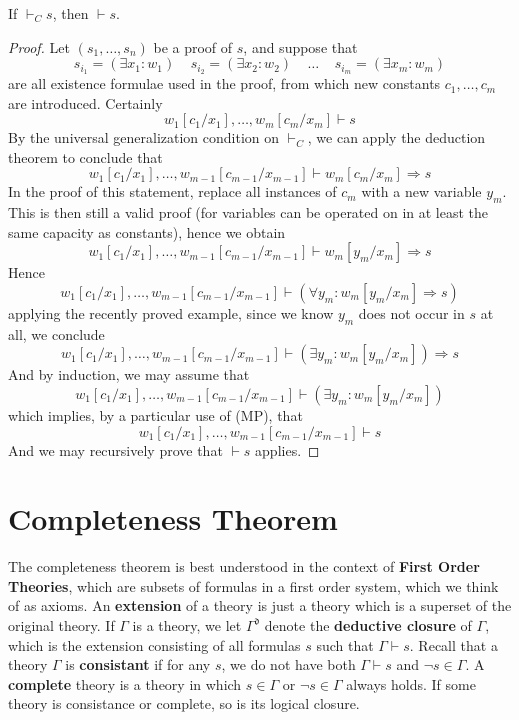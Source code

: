 \begin{theorem}
    If $\vdash_C s$, then $\vdash s$.
\end{theorem}
\begin{proof}
    Let $(s_1, \dots, s_n)$ be a proof of $s$, and suppose that
    \[ s_{i_1} = (\exists x_1: w_1)\ \ \ \ \ s_{i_2} = (\exists x_2: w_2)\ \ \ \ \ \dots\ \ \ \ \ s_{i_m} = (\exists x_m: w_m) \]
    are all existence formulae used in the proof, from which new constants $c_1, \dots, c_m$ are introduced. Certainly
    \[ w_1[c_1/x_1], \dots, w_m[c_m/x_m] \vdash s \]
    By the universal generalization condition on $\vdash_C$, we can apply the deduction theorem to conclude that
    \[ w_1[c_1/x_1], \dots, w_{m-1}[c_{m-1}/x_{m-1}] \vdash w_m[c_m/x_m] \Rightarrow s \]
    In the proof of this statement, replace all instances of $c_m$ with a new variable $y_m$. This is then still a valid proof (for variables can be operated on in at least the same capacity as constants), hence we obtain
    \[ w_1[c_1/x_1], \dots, w_{m-1}[c_{m-1}/x_{m-1}] \vdash w_m[y_m/x_m] \Rightarrow s \]
    Hence
    \[ w_1[c_1/x_1], \dots, w_{m-1}[c_{m-1}/x_{m-1}] \vdash (\forall y_m: w_m[y_m/x_m] \Rightarrow s) \]
    applying the recently proved example, since we know $y_m$ does not occur in $s$ at all, we conclude
    \[ w_1[c_1/x_1], \dots, w_{m-1}[c_{m-1}/x_{m-1}] \vdash (\exists y_m: w_m[y_m/x_m]) \Rightarrow s \]
    And by induction, we may assume that
    \[ w_1[c_1/x_1], \dots, w_{m-1}[c_{m-1}/x_{m-1}] \vdash (\exists y_m: w_m[y_m/x_m]) \]
    which implies, by a particular use of (MP), that
    \[ w_1[c_1/x_1], \dots, w_{m-1}[c_{m-1}/x_{m-1}] \vdash s \]
    And we may recursively prove that $\vdash s$ applies.
\end{proof}

\section{Completeness Theorem}

The completeness theorem is best understood in the context of {\bf First Order Theories}, which are subsets of formulas in a first order system, which we think of as axioms. An {\bf extension} of a theory is just a theory which is a superset of the original theory. If $\Gamma$ is a theory, we let $\Gamma^{\mathfrak{d}}$ denote the {\bf deductive closure} of $\Gamma$, which is the extension consisting of all formulas $s$ such that $\Gamma \vdash s$. Recall that a theory $\Gamma$ is {\bf consistant} if for any $s$, we do not have both $\Gamma \vdash s$ and $\neg s \in \Gamma$. A {\bf complete} theory is a theory in which $s \in \Gamma$ or $\neg s \in \Gamma$ always holds. If some theory is consistance or complete, so is its logical closure.

